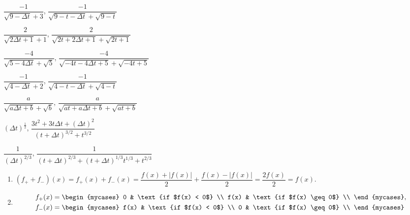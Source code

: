 \begin{exenum}
\item $\dfrac{-1}{\sqrt{9-\Delta t} +3}$,   $\dfrac{-1}{\sqrt{9-t-\Delta t} + \sqrt{9-t}}$
\item $\dfrac{2}{\sqrt{2\Delta t+1} + 1}$, $\dfrac{2}{\sqrt{2t+2\Delta t+1} + \sqrt{2t+1}}$

\item $\dfrac{-4}{\sqrt{5-4\Delta t} + \sqrt{5}}$, $\dfrac{-4}{\sqrt{-4t-4\Delta t+5} + \sqrt{-4t+5}}$

\item $\dfrac{-1}{\sqrt{4-\Delta t} + 2}$, $\dfrac{-1}{\sqrt{4-t-\Delta t} + \sqrt{4-t}}$

\item $\dfrac{a}{\sqrt{a\Delta t+b} + \sqrt{b}}$, $\dfrac{a}{\sqrt{at+a\Delta t+b} + \sqrt{at+b}}$

\item   $(\Delta t)^{\frac{1}{2}} $, $\dfrac{3t^2+3t\Delta t+(\Delta t)^2}{(t+\Delta t)^{3/2} + t^{3/2}} $

\item $\dfrac{1}{(\Delta t)^{2/3}}$,  $\dfrac{1}{(t+\Delta t)^{2/3} + (t+\Delta t)^{1/3} t^{1/3} + t^{2/3}}$

\item  \begin{enumerate}  

\addtocounter{enumii}{1}

\item $(f_{+} + f_{-})(x) =  f_{+}(x) + f_{-}(x) = \dfrac{f(x) + |f(x)|}{2} + \dfrac{f(x) - |f(x)|}{2} = \dfrac{2f(x)}{2} = f(x)$.

\item
\begin{align*}
f_{+}(x)  &=  \begin{mycases} 
    0 &  \text{if $f(x) < 0$} \\
      f(x) & \text{if $f(x)  \geq 0$} \\
   \end{mycases},\\
f_{-}(x)  &=  \begin{mycases} 
    f(x) &  \text{if $f(x) < 0$} \\
      0 & \text{if $f(x)  \geq 0$} \\
   \end{mycases}
\end{align*}

\end{enumerate}

\end{exenum}
